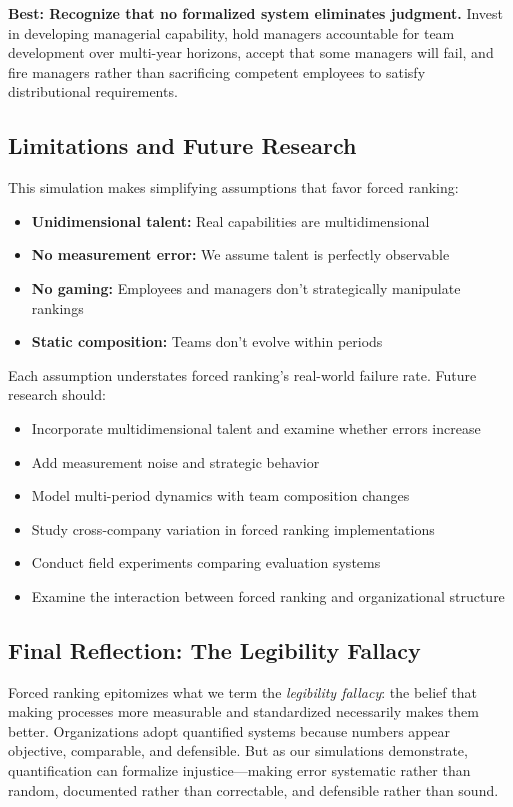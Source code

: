 \documentclass[12pt]{article}
\begin{document}
\textbf{Best: Recognize that no formalized system eliminates judgment.} Invest in developing managerial capability, hold managers accountable for team development over multi-year horizons, accept that some managers will fail, and fire managers rather than sacrificing competent employees to satisfy distributional requirements.

\subsection{Limitations and Future Research}

This simulation makes simplifying assumptions that favor forced ranking:

\begin{itemize}
\item \textbf{Unidimensional talent:} Real capabilities are multidimensional
\item \textbf{No measurement error:} We assume talent is perfectly observable
\item \textbf{No gaming:} Employees and managers don't strategically manipulate rankings
\item \textbf{Static composition:} Teams don't evolve within periods
\end{itemize}

Each assumption understates forced ranking's real-world failure rate. Future research should:

\begin{itemize}
\item Incorporate multidimensional talent and examine whether errors increase
\item Add measurement noise and strategic behavior
\item Model multi-period dynamics with team composition changes
\item Study cross-company variation in forced ranking implementations
\item Conduct field experiments comparing evaluation systems
\item Examine the interaction between forced ranking and organizational structure \citep{sandhu2019shaping}
\end{itemize}

\subsection{Final Reflection: The Legibility Fallacy}

Forced ranking epitomizes what we term the \emph{legibility fallacy}: the belief that making processes more measurable and standardized necessarily makes them better. Organizations adopt quantified systems because numbers appear objective, comparable, and defensible. But as our simulations demonstrate, quantification can formalize injustice---making error systematic rather than random, documented rather than correctable, and defensible rather than sound.
\end{document}
